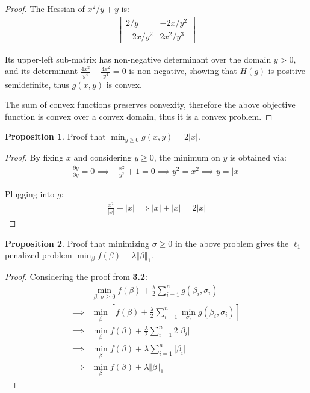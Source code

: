 \documentclass[12pt]{article}
\newcommand{\mo}[1]{\lvert #1 \rvert}
\newcommand{\mmo}[1]{\Vert #1 \Vert}
\theoremstyle{definition}
\newtheorem{prop}{Proposition}[section]
\begin{document}
	\begin{proof}
		The Hessian of $x^2/y + y$ is:
		\begin{gather*}
		\begin{bmatrix}
			2/y & -2x / y^2 \\
			-2x / y^2 & 2x^2 / y^3
		\end{bmatrix}
		\end{gather*}
		
		Its upper-left sub-matrix has non-negative determinant over the domain $y > 0$, and its determinant $\frac{4x^2}{y^4} - \frac{4x^2}{y^4} = 0$ is non-negative, showing that $H(g)$ is positive semidefinite, thus $g(x, y)$ is convex.
		
		The sum of convex functions preserves convexity, therefore the above objective function is convex over a convex domain, thus it is a convex problem.
	\end{proof}
	
	\begin{prop}
		Proof that $\min_{y \geq 0} g(x, y) = 2 \mo{x}$.
	\end{prop}
	
	\begin{proof}
		By fixing $x$ and considering $y \geq 0$, the minimum on $y$ is obtained via:
		\begin{gather*}
			\frac{\partial g}{\partial y} = 0 \implies -\frac{x^2}{y^2} + 1 = 0 \implies  y^2 = x^2 \implies y = \mo{x}
		\end{gather*}
		
		Plugging into $g$:
		\begin{gather*}
			\frac{x^2}{\mo{x}} + \mo{x} \implies \mo{x} + \mo{x} = 2\mo{x}
		\end{gather*}
	\end{proof}
	
	\begin{prop}
		Proof that minimizing $\sigma \geq 0$ in the above problem gives the $\ell_1$ penalized problem $\min_\beta f(\beta) + \lambda \mmo{\beta}_1$.
	\end{prop}
	
	\begin{proof}
		Considering the proof from \textbf{3.2}:
		\begin{align*}
			&\min_{\beta,\ \sigma \geq 0} f(\beta) + \frac{\lambda}{2}\sum_{i=1}^{n} g(\beta_i, \sigma_i) \\
			\implies &\min_\beta \left[ f(\beta) + \frac{\lambda}{2}\sum_{i=1}^{n} \min_{\sigma_i} g(\beta_i, \sigma_i) \right] \\
			\implies &\min_\beta f(\beta) + \frac{\lambda}{2}\sum_{i=1}^{n} 2 \lvert \beta_i \rvert \\
			\implies &\min_\beta f(\beta) + \lambda \sum_{i=1}^{n} \lvert \beta_i \rvert \\
			\implies &\min_\beta f(\beta) + \lambda \mmo{\beta}_1
		\end{align*}
	\end{proof}
	
\end{document}

